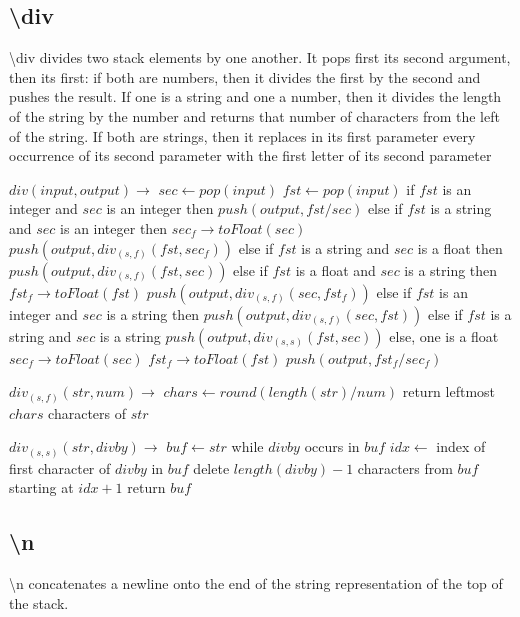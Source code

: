 \documentclass{article}
\let\bs\textbackslash
\def\pc{\bigskip\obeylines\parindent=0pt}
\begin{document}
{{{{{\subsection{\bs div}

\bs div divides two stack elements by one another.  It pops first its second argument, then its first: if both are numbers, then it divides the first by the second and pushes the result.  If one is a string and one a number, then it divides the length of the string by the number and returns that number of characters from the left of the string.  If both are strings, then it replaces in its first parameter every occurrence of its second parameter with the first letter of its second parameter

{\pc
$div(input, output) \rightarrow$
\quad $sec \leftarrow pop(input)$
\quad $fst \leftarrow pop(input)$
\quad if $fst$ is an integer and $sec$ is an integer then
\quad \quad $push(output, fst / sec)$
\quad else if $fst$ is a string and $sec$ is an integer then
\quad \quad $sec_f \rightarrow toFloat(sec)$
\quad \quad $push(output, div_{(s,f)}(fst, sec_f))$
\quad else if $fst$ is a string and $sec$ is a float then
\quad \quad $push(output, div_{(s,f)}(fst, sec))$
\quad else if $fst$ is a float and $sec$ is a string then
\quad \quad $fst_f \rightarrow toFloat(fst)$
\quad \quad $push(output, div_{(s,f)}(sec, fst_f))$
\quad else if $fst$ is an integer and $sec$ is a string then
\quad \quad $push(output, div_{(s,f)}(sec, fst))$
\quad else if $fst$ is a string and $sec$ is a string
\quad \quad $push(output, div_{(s,s)}(fst, sec))$
\quad else, one is a float
\quad \quad $sec_f \rightarrow toFloat(sec)$
\quad \quad $fst_f \rightarrow toFloat(fst)$
\quad \quad $push(output, fst_f / sec_f)$

\pc $div_{(s,f)}(str, num) \rightarrow$
\quad $chars \leftarrow round(length(str) / num)$
\quad return leftmost $chars$ characters of $str$

\pc $div_{(s,s)}(str, divby) \rightarrow$
\quad $buf \leftarrow str$
\quad while $divby$ occurs in $buf$
\quad \quad $idx \leftarrow$ index of first character of $divby$ in $buf$
\quad \quad delete $length(divby)-1$ characters from $buf$ starting at $idx+1$
\quad return $buf$
}

\subsection{\bs n}

\bs n concatenates a newline onto the end of the string representation of the top of the stack.

}}}}}
\end{document}
